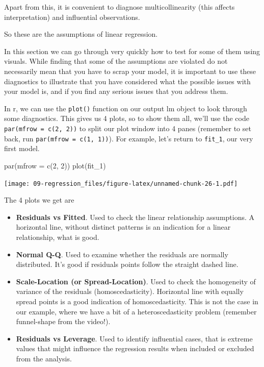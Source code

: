 \documentclass[
]{book}
\newenvironment{Shaded}{\begin{snugshade}}{\end{snugshade}}
\newcommand{\AttributeTok}[1]{\textcolor[rgb]{0.77,0.63,0.00}{#1}}
\newcommand{\DecValTok}[1]{\textcolor[rgb]{0.00,0.00,0.81}{#1}}
\newcommand{\FunctionTok}[1]{\textcolor[rgb]{0.00,0.00,0.00}{#1}}
\newcommand{\NormalTok}[1]{#1}
\providecommand{\tightlist}{%
  \setlength{\itemsep}{0pt}\setlength{\parskip}{0pt}}
\begin{document}
Apart from this, it is convenient to diagnose multicollinearity (this affects interpretation) and influential observations.

So these are the assumptions of linear regression.

In this section we can go through very quickly how to test for some of them using visuals. While finding that some of the assumptions are violated do not necessarily mean that you have to scrap your model, it is important to use these diagnostics to illustrate that you have considered what the possible issues with your model is, and if you find any serious issues that you address them.

In r, we can use the \texttt{plot()} function on our output lm object to look through some diagnostics. This gives us 4 plots, so to show them all, we'll use the code \texttt{par(mfrow\ =\ c(2,\ 2))} to split our plot window into 4 panes (remember to set back, run \texttt{par(mfrow\ =\ c(1,\ 1))}). For example, let's return to \texttt{fit\_1}, our very first model.

\begin{Shaded}
\begin{Highlighting}[]
\FunctionTok{par}\NormalTok{(}\AttributeTok{mfrow =} \FunctionTok{c}\NormalTok{(}\DecValTok{2}\NormalTok{, }\DecValTok{2}\NormalTok{))}
\FunctionTok{plot}\NormalTok{(fit\_1)}
\end{Highlighting}
\end{Shaded}

\texttt{[image: 09-regression\_files/figure-latex/unnamed-chunk-26-1.pdf]}

The 4 plots we get are

\begin{itemize}
\tightlist
\item
  \textbf{Residuals vs Fitted}. Used to check the linear relationship assumptions. A horizontal line, without distinct patterns is an indication for a linear relationship, what is good.
\item
  \textbf{Normal Q-Q}. Used to examine whether the residuals are normally distributed. It's good if residuals points follow the straight dashed line.
\item
  \textbf{Scale-Location (or Spread-Location)}. Used to check the homogeneity of variance of the residuals (homoscedasticity). Horizontal line with equally spread points is a good indication of homoscedasticity. This is not the case in our example, where we have a bit of a heteroscedasticity problem (remember funnel-shape from the video!).
\item
  \textbf{Residuals vs Leverage}. Used to identify influential cases, that is extreme values that might influence the regression results when included or excluded from the analysis.
\end{itemize}
\end{document}
